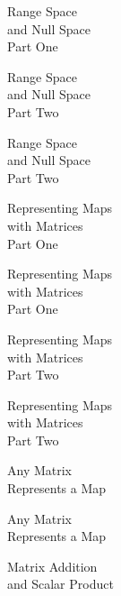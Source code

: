 \documentclass{titlescreen}
\begin{document}
\begin{videotitle}
  Range Space  \\[0.5ex]
  and Null Space  \\[1ex]
  Part One
\end{videotitle}
\begin{videoend}
  Range Space  \\[0.5ex]
  and Null Space  \\[1ex]
  Part Two
\end{videoend}

%
\begin{videotitle}
  Range Space  \\[0.5ex]
  and Null Space  \\[1ex]
  Part Two
\end{videotitle}
\begin{videoend}
  Representing Maps  \\[0.5ex]
  with Matrices  \\[1ex]
  Part One
\end{videoend}

\begin{videotitle}
  Representing Maps  \\[0.5ex]
  with Matrices  \\[1ex]
  Part One
\end{videotitle}
\begin{videoend}
  Representing Maps  \\[0.5ex]
  with Matrices  \\[1ex]
  Part Two
\end{videoend}

%
\begin{videotitle}
  Representing Maps  \\[0.5ex]
  with Matrices  \\[1ex]
  Part Two
\end{videotitle}
\begin{videoend}
  Any Matrix \\[0.5ex]
  Represents a Map
\end{videoend}

%
\begin{videotitle}
  Any Matrix \\[0.5ex]
  Represents a Map
\end{videotitle}
\begin{videoend}
  Matrix Addition  \\[0.5ex]
  and Scalar Product 
\end{videoend}
\end{document}
